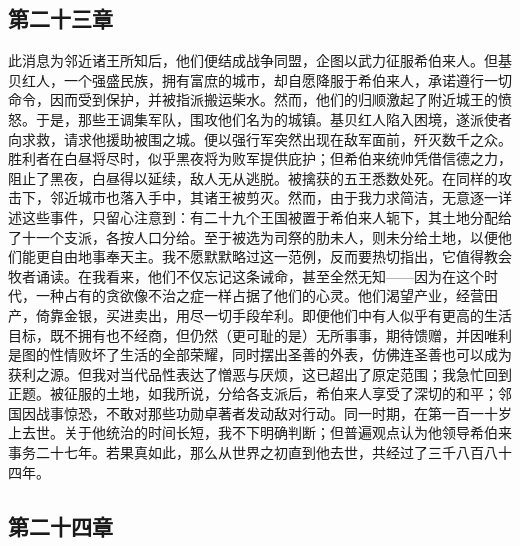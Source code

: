 
\subsection{第二十三章}

此消息为邻近诸王所知后，他们便结成战争同盟，企图以武力征服希伯来人。但基贝红人，一个强盛民族，拥有富庶的城市，却自愿降服于希伯来人，承诺遵行一切命令，因而受到保护，并被指派搬运柴水。然而，他们的归顺激起了附近城王的愤怒。于是，那些王调集军队，围攻他们名为的城镇。基贝红人陷入困境，遂派使者向求救，请求他援助被围之城。便以强行军突然出现在敌军面前，歼灭数千之众。胜利者在白昼将尽时，似乎黑夜将为败军提供庇护；但希伯来统帅凭借信德之力，阻止了黑夜，白昼得以延续，敌人无从逃脱。被擒获的五王悉数处死。在同样的攻击下，邻近城市也落入手中，其诸王被剪灭。然而，由于我力求简洁，无意逐一详述这些事件，只留心注意到：有二十九个王国被置于希伯来人轭下，其土地分配给了十一个支派，各按人口分给。至于被选为司祭的肋未人，则未分给土地，以便他们能更自由地事奉天主。我不愿默默略过这一范例，反而要热切指出，它值得教会牧者诵读。在我看来，他们不仅忘记这条诫命，甚至全然无知——因为在这个时代，一种占有的贪欲像不治之症一样占据了他们的心灵。他们渴望产业，经营田产，倚靠金银，买进卖出，用尽一切手段牟利。即便他们中有人似乎有更高的生活目标，既不拥有也不经商，但仍然（更可耻的是）无所事事，期待馈赠，并因唯利是图的性情败坏了生活的全部荣耀，同时摆出圣善的外表，仿佛连圣善也可以成为获利之源。但我对当代品性表达了憎恶与厌烦，这已超出了原定范围；我急忙回到正题。被征服的土地，如我所说，分给各支派后，希伯来人享受了深切的和平；邻国因战事惊恐，不敢对那些功勋卓著者发动敌对行动。同一时期，在第一百一十岁上去世。关于他统治的时间长短，我不下明确判断；但普遍观点认为他领导希伯来事务二十七年。若果真如此，那么从世界之初直到他去世，共经过了三千八百八十四年。\par


\subsection{第二十四章}

